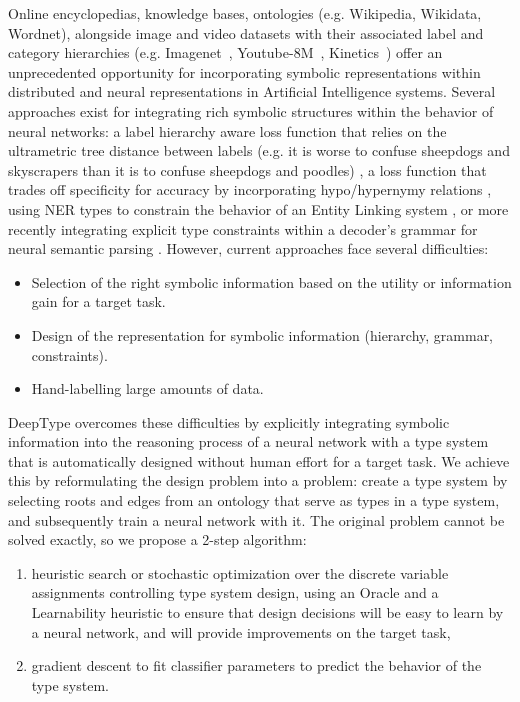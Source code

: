 \documentclass[letterpaper]{article}
\begin{document}
Online encyclopedias, knowledge bases, ontologies (e.g. Wikipedia, Wikidata, Wordnet), alongside image and video datasets with their associated label and category hierarchies (e.g. Imagenet~\cite{deng2009imagenet}, Youtube-8M~\cite{abu2016youtube}, Kinetics~\cite{kay2017kinetics}) offer an unprecedented opportunity for incorporating symbolic representations within distributed and neural representations in Artificial Intelligence systems.
Several approaches exist for integrating rich symbolic structures within the behavior of neural networks: a label hierarchy aware loss function that relies on the ultrametric tree distance between labels (e.g. it is worse to confuse sheepdogs and skyscrapers than it is to confuse sheepdogs and poodles) \cite{wu2017hierarchical}, a loss function that trades off specificity for accuracy by incorporating hypo/hypernymy relations \cite{deng2012hedging}, using NER types to constrain the behavior of an Entity Linking system \cite{ling2015design}, or more recently integrating explicit type constraints within a decoder's grammar for neural semantic parsing \cite{jayant2017parsing}.
However, current approaches face several difficulties:
\begin{itemize}
\item Selection of the right symbolic information based on the utility or information gain for a target task.
\item Design of the representation for symbolic information (hierarchy, grammar, constraints).
\item Hand-labelling large amounts of data.
\end{itemize}

DeepType overcomes these difficulties by explicitly integrating symbolic information into the reasoning process of a neural network with a type system that is automatically designed without human effort for a target task. We achieve this by reformulating the design problem into a  problem: create a type system by selecting roots and edges from an ontology that serve as types in a type system, and subsequently train a neural network with it. The original problem cannot be solved exactly, so we propose a 2-step algorithm:
\begin{enumerate}
\item heuristic search or stochastic optimization over the discrete variable assignments controlling type system design, using an Oracle and a  Learnability heuristic to ensure that design decisions will be easy to learn by a neural network, and will provide improvements on the target task,
\item gradient descent to fit classifier parameters to predict the behavior of the type system.
\end{enumerate}
\end{document}
